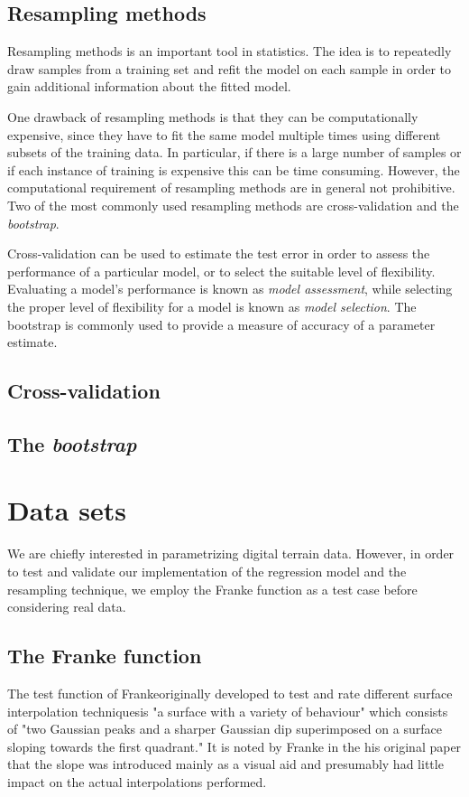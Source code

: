 \documentclass[a4paper, twocolumn]{article}
\begin{document}
\subsection{Resampling methods \label{sect:resampling}}
Resampling methods is an important tool in statistics. The idea is to repeatedly draw samples from a training set and refit 
the model on each sample in order to gain additional information about the fitted model.

One drawback of resampling methods is that they can be computationally expensive, since they have to fit the same model 
multiple times using different subsets of the training data. In particular, if there is a large number of samples or if 
each instance of training is expensive this can be time consuming. However, the computational requirement of resampling methods 
are in general not prohibitive. Two of the most commonly used resampling methods are cross-validation and 
the \textit{bootstrap}.

Cross-validation can be used to estimate the test error in order to assess the performance of a particular model, or to select 
the suitable level of flexibility. Evaluating a model's performance is known as \textit{model assessment}, while selecting the 
proper level of flexibility for a model is known as \textit{model selection}. The bootstrap is commonly used to provide 
a measure of accuracy of a parameter estimate.

\subsection{Cross-validation}
\lipsum[4]
\subsection{The \textit{bootstrap}}
\lipsum[2]

\section{Data sets}
We are chiefly interested in parametrizing digital terrain data. However, in order to test and validate our implementation of the regression model and the resampling technique, we employ the Franke function\autocite{franke1979critical} as a test case before considering real data.

\subsection{The Franke function \label{sect:franke}}
The test function of Franke\textemdash originally developed to test and rate different surface interpolation techniques\textemdash is "a surface with a variety of behaviour" which consists of "two Gaussian peaks and a sharper Gaussian dip superimposed on a surface sloping towards the first quadrant."\autocite{franke1979critical} It is noted by Franke in the his original paper that the slope was introduced mainly as a visual aid and presumably had little impact on the actual interpolations performed. 
\end{document}
